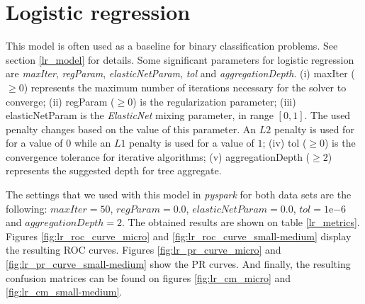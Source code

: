 \documentclass[LaM,binding=0.6cm, english]{sapthesis}
\begin{document}
\section{Logistic regression}

This model is often used as a baseline for binary classification problems. See section \ref{lr_model} for details. Some significant parameters for logistic regression are \textit{maxIter}, \textit{regParam}, \textit{elasticNetParam}, \textit{tol} and \textit{aggregationDepth}. (i) maxIter ($\ge 0$) represents the maximum number of iterations necessary for the solver to converge; (ii) regParam ($\ge 0$) is the regularization parameter; (iii) elasticNetParam is the \textit{ElasticNet} mixing parameter, in range $[0, 1]$. The used penalty changes based on the value of this parameter. An $L2$ penalty is used for for a value of $0$ while an $L1$ penalty is used for a value of $1$; (iv) tol ($\ge 0$) is the convergence tolerance for iterative algorithms; (v) aggregationDepth ($\ge 2$) represents the suggested depth for tree aggregate.\cite{pysparkLR}

The settings that we used with this model in \textit{pyspark}  for both data sets are the following: $maxIter = 50$, $regParam = 0.0$, $elasticNetParam = 0.0$, $tol = 1\mathrm{e}{-6}$ and $aggregationDepth = 2$. The obtained results are shown on table \ref{lr_metrics}. Figures \ref{fig:lr_roc_curve_micro} and \ref{fig:lr_roc_curve_small-medium} display the resulting ROC curves. Figures \ref{fig:lr_pr_curve_micro} and \ref{fig:lr_pr_curve_small-medium} show the PR curves. And finally, the resulting confusion matrices can be found on figures \ref{fig:lr_cm_micro} and \ref{fig:lr_cm_small-medium}.
 
\begin{table}[!ht]
\centering
{}
\vspace{2mm}
\caption{Logistic regression metrics}
\label{lr_metrics}
\end{table}
\end{document}
